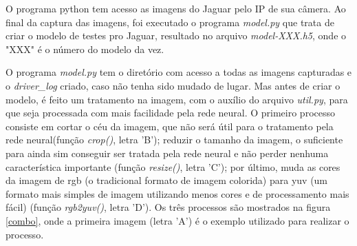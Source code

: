 	\begin{figure}[H]
		\centering
\end{figure}

O programa python tem acesso as imagens do Jaguar pelo IP de sua câmera. Ao final da captura das imagens, foi executado o programa \textit{model.py} que trata de criar o modelo de testes pro Jaguar, resultado no arquivo \textit{model-XXX.h5}, onde o "XXX" é o número do modelo da vez.

O programa \textit{model.py} tem o diretório com acesso a todas as imagens capturadas e o \textit{driver\_log} criado, caso não tenha sido mudado de lugar. Mas antes de criar o modelo, é feito um tratamento na imagem, com o auxílio do arquivo \textit{util.py}, para que seja processada com mais facilidade pela rede neural. O primeiro processo consiste em cortar o céu da imagem, que não será útil para o tratamento pela rede neural(função \textit{crop()}, letra 'B'); reduzir o tamanho da imagem, o suficiente para ainda sim conseguir ser tratada pela rede neural e não perder nenhuma característica importante (função \textit{resize()}, letra 'C'); por último, muda as cores da imagem de rgb (o tradicional formato de imagem colorida) para yuv (um formato mais simples de imagem utilizando menos cores e de processamento mais fácil) (função \textit{rgb2yuv()}, letra 'D'). Os três processos são mostrados na figura \ref{combo}, onde a primeira imagem (letra 'A') é o exemplo utilizado para realizar o processo.


